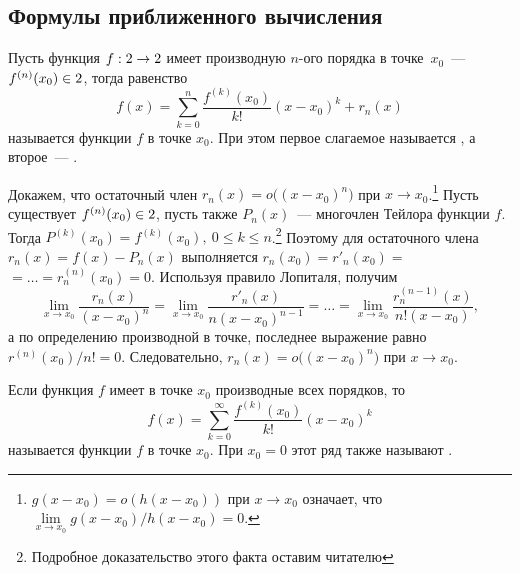 \subsection{Формулы приближенного вычисления}
Пусть функция $f: 2 \rightarrow 2$ имеет производную $n$-ого порядка в точке~$x_0$~--- $f^{(n)}(x_0) \in 2$, тогда равенство
\begin{equation}
    f(x) = \sum\limits_{k=0}^{n} \frac{f^{(k)}(x_0)}{k!} (x - x_0)^k + r_n(x)
    \label{eq:taylor-formula}
\end{equation}
называется  функции $f$ в точке $x_0$. При этом первое слагаемое называется , а второе~--- .

Докажем, что остаточный член $r_n(x) = o\big( (x - x_0)^n \big)$ при $x \rightarrow x_0$.\footnote{$g(x - x_0) = o(h(x - x_0))$ при $x \rightarrow x_0$ означает, что $\lim\limits_{x \rightarrow x_0} g(x - x_0) / h(x - x_0) = 0$.} Пусть существует $f^{(n)} (x_0) \in 2$, пусть также $P_n(x)$~--- многочлен Тейлора функции $f$. Тогда $P^{(k)}(x_0) = f^{(k)}(x_0), ~ 0 \leqslant k \leqslant n$.\footnote{Подробное доказательство этого факта оставим читателю} Поэтому для остаточного члена $r_n(x) = f(x) - P_n(x)$ выполняется $r_n(x_0) = r'_n(x_0) =$ $= \ldots = r_n^{(n)}(x_0) = 0$. Используя правило Лопиталя, получим
\begin{equation*}
    \lim_{x \rightarrow x_0} \frac{r_n(x)}{(x - x_0)^n}
        = \lim_{x \rightarrow x_0} \frac{r'_n(x)}{n (x - x_0)^{n-1}}
        = \ldots
        = \lim_{x \rightarrow x_0} \frac{r^{(n-1)}_n(x)}{n!(x - x_0)},
\end{equation*}
а по определению производной в точке, последнее выражение равно $r^{(n)}(x_0) / n! = 0$. Следовательно, $r_n(x) = o\big( (x - x_0)^n \big)$ при $x \rightarrow x_0$.

Если функция $f$ имеет в точке $x_0$ производные всех порядков, то
\begin{equation}
    f(x) = \sum\limits_{k=0}^{\infty} \frac{f^{(k)}(x_0)}{k!} (x - x_0)^k
    \label{eq:taylor-series}
\end{equation}
называется  функции $f$ в точке $x_0$. При $x_0 = 0$ этот ряд также называют .


